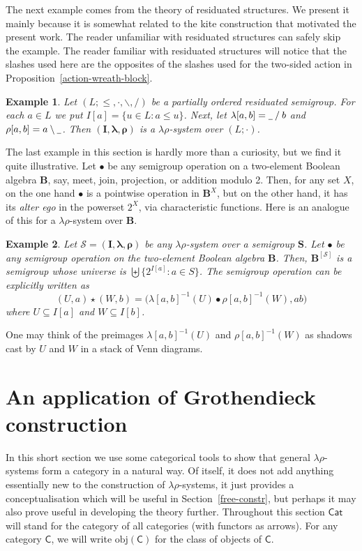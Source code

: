 \documentclass{amsart}
\newtheorem{example}{Example}
\def\ld{\mathbin{\backslash}}
\def\rd{\mathbin{/}}
\newcommand{\bl}{\underline{\hspace{1ex}}}
\newcommand{\blambda}{\boldsymbol{\lambda}}
\newcommand{\brho}{\boldsymbol{\rho}}
\begin{document}
The next example comes from the theory of residuated structures.
We present it mainly because it is somewhat related to the 
kite construction that motivated the present work. The reader unfamiliar with
residuated structures can safely skip the example. The reader familiar with
residuated structures will notice that the slashes used here are the opposites of
the slashes used for the two-sided action in
Proposition~\ref{action-wreath-block}. 


\begin{example}\label{rl-example}
Let $(L;\leq, \cdot,\ld,\rd)$ be a partially ordered residuated semigroup.
For each $a\in L$ we put 
$I[a] = \{u\in L\colon a\leq u\}$. Next, let $\lambda[a,b] = \bl\rd b$ and
$\rho[a,b] = a\ld\bl$. Then $(\mathbf{I},\blambda,\brho)$ is a
$\lambda\rho$-system over $(L;\cdot)$.
\end{example} 


The last example in this section is hardly more than a curiosity, but we find it
quite illustrative. Let $\bullet$ be any semigroup operation on a
two-element Boolean algebra $\mathbf{B}$, say, meet, join, projection, or
addition modulo 2. Then, for any set $X$, on the one hand
$\bullet$ is a pointwise operation in $\mathbf{B}^X$, but on the
other hand, it has its \emph{alter ego} in the powerset $2^X$, via
characteristic functions. Here is an analogue of this for a
$\lambda\rho$-system over $\mathbf{B}$.
\begin{example}
Let $\mathcal{S} = (\mathbf{I},\blambda,\brho)$ be any
$\lambda\rho$-system over a semigroup $\mathbf{S}$. Let $\bullet$ be any semigroup
operation on the two-element Boolean algebra $\mathbf{B}$. Then, 
$\mathbf{B}^{[\mathcal{S}]}$ is a semigroup whose universe is 
$\biguplus\{2^{I[a]}: a\in S\}$. The semigroup operation  
can be explicitly written as
$$
(U,a)\star (W,b) = \bigl(\lambda[a,b]^{-1}(U)\bullet\rho[a,b]^{-1}(W), ab\bigr) 
$$
where $U\subseteq I[a]$ and $W\subseteq I[b]$.
\end{example}  
One may think of the preimages $\lambda[a,b]^{-1}(U)$ and $\rho[a,b]^{-1}(W)$
as shadows cast by $U$ and $W$ in a stack of Venn diagrams.


\section{An application of Grothendieck construction}\label{cats}

In this short section we use some categorical tools to show that general
$\lambda\rho$-systems form a category in a natural way. Of itself, it does not add
anything essentially new to the construction of $\lambda\rho$-systems,
it just provides a conceptualisation which
will be useful in Section~\ref{free-constr}, but perhaps
it may also prove useful in developing the theory further.
Throughout this section $\mathsf{Cat}$ will stand for the category of all
categories (with functors as arrows). For any
category $\mathsf{C}$, we will write $\mathrm{obj}(\mathsf{C})$ for the class of
objects of $\mathsf{C}$.  
\end{document}
